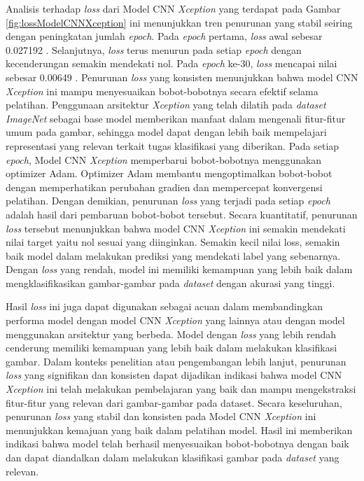 Analisis terhadap \textit{loss} dari Model CNN \textit{Xception} yang terdapat pada Gambar \ref{fig:lossModelCNNXception} ini menunjukkan tren penurunan yang stabil seiring dengan peningkatan jumlah \textit{epoch}. Pada \textit{epoch} pertama, \textit{loss} awal sebesar 0.027192 . Selanjutnya, \textit{loss} terus menurun pada setiap \textit{epoch} dengan kecenderungan semakin mendekati nol. Pada \textit{epoch} ke-30, \textit{loss} mencapai nilai sebesar 0.00649 . Penurunan \textit{loss} yang konsisten menunjukkan bahwa model CNN \textit{Xception} ini mampu menyesuaikan bobot-bobotnya secara efektif selama pelatihan. Penggunaan arsitektur \textit{Xception} yang telah dilatih pada \textit{dataset} \textit{ImageNet} sebagai base model memberikan manfaat dalam mengenali fitur-fitur umum pada gambar, sehingga model dapat dengan lebih baik mempelajari representasi yang relevan terkait tugas klasifikasi yang diberikan. Pada setiap \textit{epoch}, Model CNN \textit{Xception} memperbarui bobot-bobotnya menggunakan optimizer Adam. Optimizer Adam membantu mengoptimalkan bobot-bobot dengan memperhatikan perubahan gradien dan mempercepat konvergensi pelatihan. Dengan demikian, penurunan \textit{loss} yang terjadi pada setiap \textit{epoch} adalah hasil dari pembaruan bobot-bobot tersebut. Secara kuantitatif, penurunan \textit{loss} tersebut menunjukkan bahwa model CNN \textit{Xception} ini semakin mendekati nilai target yaitu nol sesuai yang diinginkan. Semakin kecil nilai loss, semakin baik model dalam melakukan prediksi yang mendekati label yang sebenarnya. Dengan \textit{loss} yang rendah, model ini memiliki kemampuan yang lebih baik dalam mengklasifikasikan gambar-gambar pada \textit{dataset} dengan akurasi yang tinggi.

Hasil \textit{loss} ini juga dapat digunakan sebagai acuan dalam membandingkan performa model dengan model CNN \textit{Xception} yang lainnya atau dengan model menggunakan arsitektur yang berbeda. Model dengan \textit{loss} yang lebih rendah cenderung memiliki kemampuan yang lebih baik dalam melakukan klasifikasi gambar. Dalam konteks penelitian atau pengembangan lebih lanjut, penurunan \textit{loss} yang signifikan dan konsisten dapat dijadikan indikasi bahwa model CNN \textit{Xception} ini telah melakukan pembelajaran yang baik dan mampu mengekstraksi fitur-fitur yang relevan dari gambar-gambar pada dataset. Secara keseluruhan, penurunan \textit{loss} yang stabil dan konsisten pada Model CNN \textit{Xception} ini menunjukkan kemajuan yang baik dalam pelatihan model. Hasil ini memberikan indikasi bahwa model telah berhasil menyesuaikan bobot-bobotnya dengan baik dan dapat diandalkan dalam melakukan klasifikasi gambar pada \textit{dataset} yang relevan.

